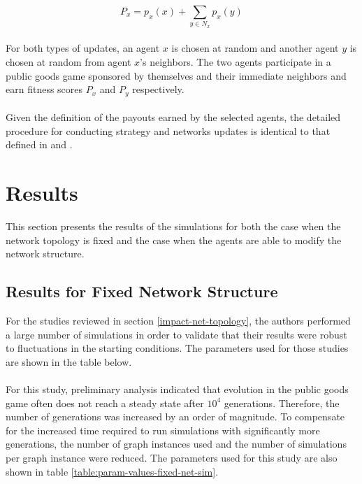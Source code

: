 \documentclass{article}
\begin{document}
	\begin{equation}
	P_x=p_x(x)+\sum_{y \in N_x} p_x(y)
	\end{equation}

	\paragraph{}For both types of updates, an agent $x$ is chosen at random and another agent $y$ is chosen at random from agent $x$'s neighbors.  The two agents participate in a public goods game sponsored by themselves and their immediate neighbors and earn fitness scores $P_x$ and $P_y$ respectively.
	\paragraph{}Given the definition of the payouts earned by the selected agents, the detailed procedure for conducting strategy and networks updates is identical to that defined in \cite{Santos2006d} and \cite{Fu2008}.

	\section{Results}
	This section presents the results of the simulations for both the case when the network topology is fixed and the case when the agents are able to modify the network structure.

	\subsection{Results for Fixed Network Structure}
	For the studies reviewed in section \ref{impact-net-topology}, the authors performed a large number of simulations in order to validate that their results were robust to fluctuations in the starting conditions.  The parameters used for those studies are shown in the table below.
	\paragraph{}For this study, preliminary analysis indicated that evolution in the public goods game often does not reach a steady state after $10^4$ generations.  Therefore, the number of generations was increased by an order of magnitude.  To compensate for the increased time required to run simulations with significantly more generations, the number of graph instances used and the number of simulations per graph instance were reduced.  The parameters used for this study are also shown in table \ref{table:param-values-fixed-net-sim}.
\end{document}

